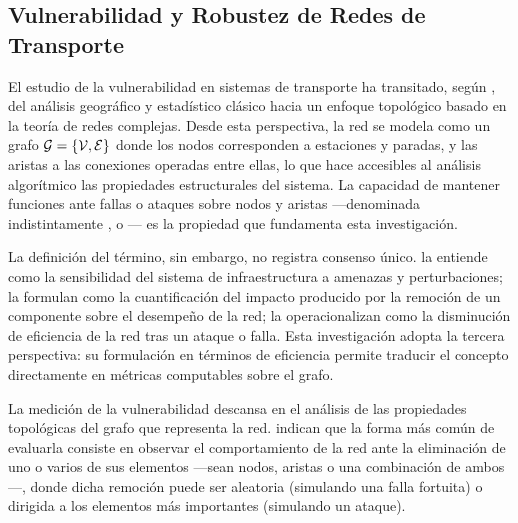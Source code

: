 
\subsection{Vulnerabilidad y Robustez de Redes de Transporte}
\label{subsec:ea-vulnerabilidad}

El estudio de la vulnerabilidad en sistemas de transporte ha transitado, según
\citet{lotero2014vulnerabilidad}, del análisis geográfico y estadístico clásico
hacia un enfoque topológico basado en la teoría de redes complejas. Desde esta
perspectiva, la red se modela como un grafo $\mathcal{G} = \{\mathcal{V}, \mathcal{E}\}$
donde los nodos corresponden a estaciones y paradas, y las aristas a las
conexiones operadas entre ellas, lo que hace accesibles al análisis algorítmico
las propiedades estructurales del sistema. La capacidad de mantener funciones
ante fallas o ataques sobre nodos y aristas ---denominada indistintamente
,  o --- es la
propiedad que fundamenta esta investigación.

La definición del término, sin embargo, no registra consenso único.
\citet{holmgren2006vulnerability} la entiende como la sensibilidad del sistema
de infraestructura a amenazas y perturbaciones; \citet{nagurney2009fragile} la
formulan como la cuantificación del impacto producido por la remoción de un
componente sobre el desempeño de la red; \citet{ouyang2009vulnerability} la
operacionalizan como la disminución de eficiencia de la red tras un ataque o
falla. Esta investigación adopta la tercera perspectiva: su formulación en
términos de eficiencia permite traducir el concepto directamente en métricas
computables sobre el grafo.

La medición de la vulnerabilidad descansa en el análisis de las propiedades
topológicas del grafo que representa la red. \citet{lotero2014vulnerabilidad}
indican que la forma más común de evaluarla consiste en observar el
comportamiento de la red ante la eliminación de uno o varios de sus elementos
---sean nodos, aristas o una combinación de ambos---, donde dicha remoción puede
ser aleatoria (simulando una falla fortuita) o dirigida a los elementos más
importantes (simulando un ataque).


